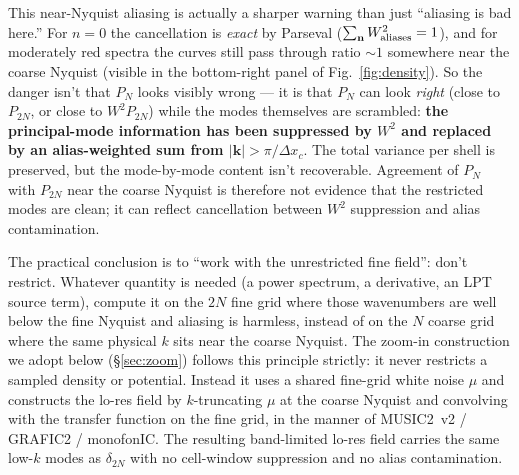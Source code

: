 \documentclass[12pt]{article}
\begin{document}
This near-Nyquist aliasing is actually a sharper warning than just
``aliasing is bad here.'' For $n=0$ the cancellation is \emph{exact}
by Parseval ($\sum_{\mathbf n}W^2_{\rm aliases}=1$), and for
moderately red spectra the curves still pass through ratio
$\sim 1$ somewhere near the coarse Nyquist (visible in the
bottom-right panel of Fig.~\ref{fig:density}). So the danger isn't
that $P_N$ looks visibly wrong --- it is that $P_N$ can look
\emph{right} (close to $P_{2N}$, or close to $W^2 P_{2N}$) while the
modes themselves are scrambled: \textbf{the principal-mode
information has been suppressed by $W^2$ and replaced by an
alias-weighted sum from $|\mathbf k|>\pi/\Delta x_c$}. The total variance per shell is
preserved, but the mode-by-mode content isn't recoverable. Agreement
of $P_N$ with $P_{2N}$ near the coarse Nyquist is therefore not
evidence that the restricted modes are clean; it can reflect
cancellation between $W^2$ suppression and alias contamination.

The practical conclusion is to ``work with the unrestricted fine
field'': don't restrict. Whatever quantity is needed (a power
spectrum, a derivative, an LPT source term), compute it on the $2N$
fine grid where those wavenumbers are well below the fine Nyquist and
aliasing is harmless, instead of on the $N$ coarse grid where the
same physical $k$ sits near the coarse Nyquist. The zoom-in
construction we adopt below (\S\ref{sec:zoom}) follows this principle
strictly: it never restricts a sampled density or potential. Instead
it uses a shared fine-grid white noise $\mu$ and constructs the
lo-res field by $k$-truncating $\mu$ at the coarse Nyquist and
convolving with the transfer function on the fine grid, in the manner
of MUSIC2~v2 / GRAFIC2 / monofonIC. The resulting band-limited
lo-res field carries the same low-$k$ modes as $\delta_{2N}$ with no
cell-window suppression and no alias contamination.
\end{document}
